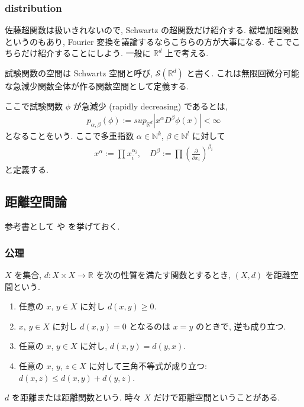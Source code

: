 \documentclass[openany, a4paper, oneside]{jsbook}
\begin{document}
\subsubsection{distribution}

佐藤超関数は扱いきれないので, Schwartz の超関数だけ紹介する.
緩増加超関数というのもあり, Fourier 変換を議論するならこちらの方が大事になる.
そこでこちらだけ紹介することにしよう.
一般に $\mathbb{R}^d$ 上で考える.

試験関数の空間は Schwartz 空間と呼び, $\mathcal{S} (\mathbb{R}^d)$ と書く.
これは無限回微分可能な急減少関数全体が作る関数空間として定義する.

ここで試験関数 $\phi$ が急減少 (rapidly decreasing) であるとは,
\begin{align}
 p_{\alpha, \beta} (\phi)
 :=
 sup_{\mathbb{R}^d} \left| x^{\alpha} D^{\beta} \phi (x) \right|
 < \infty
\end{align}
となることをいう.
ここで多重指数 $\alpha \in \mathbb{N}^k$, $\beta \in \mathbb{N}^l$ に対して
\begin{align}
 x^{\alpha}
 :=
 \prod x_i^{\alpha_i}, \quad
 D^{\beta}
 :=
 \prod \left ( \frac{\partial}{\partial x_i} \right)^{\beta_i}
\end{align}
と定義する.
\subsection{距離空間論}

参考書として \cite{ShigeoIchiraku1} や \cite{KazuoMatsuzaka1} を挙げておく.
\subsubsection{公理}

$X$ を集合, $d \colon X \times X \to \mathbb{R}$ を次の性質を満たす関数とするとき, $(X, d)$ を距離空間という.
\begin{enumerate}
\item 任意の $x$, $y \in X$ に対し $d (x, y) \geq 0$.
\item $x$, $y \in X$ に対し $d (x, y) = 0$ となるのは $x=y$ のときで, 逆も成り立つ.
\item 任意の $x$, $y \in X$ に対し, $d (x,y) = d (y,x)$.
\item 任意の $x$, $y$, $z \in X$ に対して三角不等式が成り立つ: $d (x,z) \leq d (x,y) + d (y,z)$.
\end{enumerate}
$d$ を距離または距離関数という.
時々 $X$ だけで距離空間ということがある.
\end{document}
